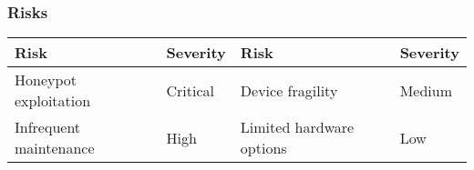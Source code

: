 \begin{frame}
\frametitle{Risks}

\begin{table}
\begin{center}
\begin{tabular}{l l | l l}
\textbf{Risk} & \textbf{Severity} & \textbf{Risk} & \textbf{Severity} \\
\midrule
Honeypot exploitation & Critical & Device fragility & Medium \\
Infrequent maintenance & High & Limited hardware options & Low \\
\bottomrule
\end{tabular}
\end{center}
\end{table}


\begin{figure}                                                                 
\centering
{
\scalebox{0.35}{}
}
\end{figure}

\end{frame}
